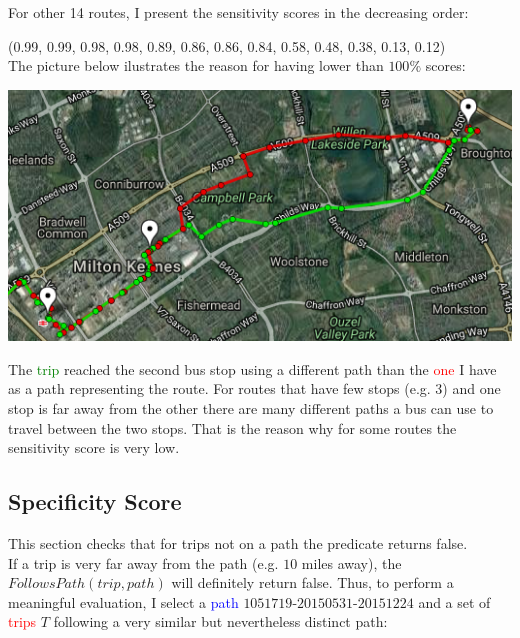 \documentclass[12pt,a4paper,oneside,openright]{report}
\begin{document}
For other 14 routes, I present the sensitivity scores in the decreasing order:

(0.99, 0.99, 0.98, 0.98, 0.89, 0.86, 0.86, 0.84, 0.58, 0.48, 0.38, 0.13, 0.12) \\

The picture below ilustrates the reason for having lower than $100\%$ scores:

\includegraphics[width=\textwidth]{figs/same_route_wrong_path.png}

The \textcolor{green}{trip} reached the second bus stop using a different path
than the \textcolor{red}{one} I have as a path representing the route.
For routes that have few stops (e.g. 3) and one stop is far away from the other
there are many different paths a bus can use to travel between the two stops. That is the
reason why for some routes the sensitivity score is very low.

\subsection{Specificity Score}

This section checks that for trips not on a path the predicate returns false. \\

If a trip is very far away from the path (e.g. $10$ miles away), the
$FollowsPath(trip, path)$ will definitely return false. Thus, to perform
a meaningful evaluation, I select a \textcolor{blue}{path}
$1051719$-$20150531$-$20151224$ and a set of \textcolor{red}{trips}
$T$ following a very similar but nevertheless distinct path: \\
\end{document}
